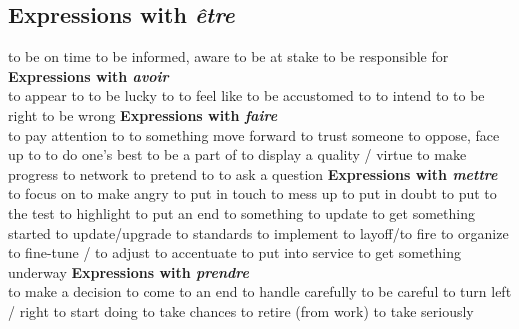 \subsection*{Expressions with {\em être}}
   {to be on time}
   {to be informed, aware}
   {to be at stake}
   {to be responsible for}
{\sffamily\bfseries Expressions with {\em avoir}}\\
   {to appear to}
   {to be lucky to}
   {to feel like}
   {to be accustomed to}
   {to intend to}
   {to be right}
   {to be wrong}
{\sffamily\bfseries Expressions with {\em faire}}\\
   {to pay attention to}
   {to something move forward}
   {to trust someone}
   {to oppose, face up to}
   {to do one’s best} 
   {to be a part of}
   {to display a quality / virtue}
   {to make progress}
   {to network}
   {to pretend to}
   {to ask a question}
{\sffamily\bfseries Expressions with {\em mettre}}\\
   {to focus on}
   {to make angry}
   {to put in touch}
   {to mess up}
   {to put in doubt}
   {to put to the test}
   {to highlight}
   {to put an end to something}
   {to update}
   {to get something started}
 {to update/upgrade to standards}
   {to implement}
   {to layoff/to fire}
   {to organize}
   {to fine-tune / to adjust}
   {to accentuate}
   {to put into service}
   {to get something underway}
{\sffamily\bfseries Expressions with {\em prendre}}\\
   {to make a decision}
   {to come to an end}
   {to handle carefully}
   {to be careful}
   {to turn left / right}
   {to start doing}
   {to take chances}
   {to retire (from work)}
   {to take seriously}

